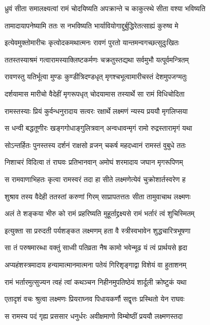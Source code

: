 \twolineshloka
{ध्रुवं सीता समालक्ष्यत्वां रामं चोदयिष्यति}
{अपक्रान्ते च काकुत्स्थे सीता वश्या भविष्यति}


\twolineshloka
{तामादायापनेष्यामि ततः स नभविष्यति}
{भार्यावियोगाद्दुर्बुद्धिरेतत्साह्यं कुरुष्व मे}


\twolineshloka
{इत्येवमुक्तोमारीचः कृत्वोदकमथात्मनः}
{रावणं पुरतो यान्तमन्वगच्छत्सुदुःखितः}


\twolineshloka
{ततस्तस्याश्रमं गत्वारामस्याक्लिष्टकर्मणः}
{चक्रतुस्तद्यथा सर्वमुभौ यत्पूर्वमन्त्रितम्}


\twolineshloka
{रावणस्तु यतिर्भूत्वा मुण्डः कुण्डीत्रिदण्डधृत्}
{मृगश्चभूत्वामारीचस्तं देशमुपजग्मतुः}


\twolineshloka
{दर्शयामास मारीचो वैदेहीं मृगरूपधृत्}
{चोदयामास तस्यार्थे सा रामं विधिचोदिता}


\twolineshloka
{रामस्तस्याः प्रियं कुर्वन्धनुरादाय सत्वरः}
{रक्षार्थे लक्ष्मणं न्यस्य प्रययौ मृगलिप्सया}


\twolineshloka
{स धन्वी बद्धतूणीरः खङ्गगोधाङ्गुलित्रवान्}
{अन्वधावन्मृगं रामो रुद्रस्तारामृगं यथा}


\twolineshloka
{सोऽन्तर्हितः पुनस्तस्य दर्शनं राक्षसो व्रजन्}
{चकर्ष महदध्वानं रामस्तं वुबुधे ततः}


\twolineshloka
{निशाचरं विदित्वा तं राघवः प्रतिभानवान्}
{अमोघं शरमादाय जघान मृगरूपिणम्}


\twolineshloka
{स रामवाणाभिहतः कृत्वा रामस्वरं तदा}
{हा सीते लक्ष्मणेत्येवं चुक्रोशार्तस्वरेण ह}


\twolineshloka
{शुश्राव तस्य वैदेही ततस्तां करुणां गिरम्}
{साप्रापतत्ततः सीता तामुवाचाथ लक्ष्मणः}


\twolineshloka
{अलं ते शङ्कया भीरु को रामं प्रहरिष्यति}
{मुहूर्ताद्द्रक्ष्यसे रामं भर्तारं त्वं शुचिस्मितम्}


\twolineshloka
{इत्युक्ता सा प्ररुदती पर्यशङ्कत लक्ष्मणम्}
{हता वै स्त्रीस्वभावेन शुद्धचारित्रभूषणा}


\twolineshloka
{सा तं परुषमारब्धा वक्तुं साध्वी पतिव्रता}
{नैष कामो भवेन्मूढ यं त्वं प्रार्थयसे हृदा}


\twolineshloka
{अप्यहंशस्त्रमादाय हन्यामात्मानमात्मना}
{पतेयं गिरिशृङ्गाद्वा विशेयं वा हुताशनम्}


\twolineshloka
{रामं भर्तारमुत्सुज्यन त्वहं त्वां कथञ्चन}
{निहीनमुपतिष्ठेयं शार्दूली क्रोष्टुकं यथा}


\twolineshloka
{एतादृशं वचः श्रुत्वा लक्ष्मणः प्रियराघ्नव}
{पिधायकर्णौ सद्वृत्तः प्रस्थितो येन राघवः}


\twolineshloka
{स रामस्य पदं गृह्य प्रससार धनुर्धरः}
{अवीक्षमाणो विम्बोष्ठीं प्रययौ लक्ष्मणस्तदा}


